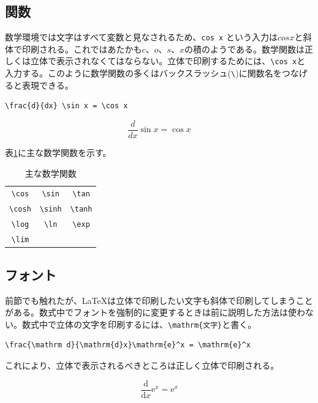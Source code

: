 \subsection{関数}
\label{sec:latex:func}

数学環境では文字はすべて変数と見なされるため、\verb|cos x| という入力は$cos x$と斜体で印刷される。これではあたかも$c$、$o$、$s$、$x$の積のようである。数学関数は正しくは立体で表示されなくてはならない。立体で印刷するためには、\verb|\cos x|と入力する。このように数学関数の多くはバックスラッシュ(\texttt{\textbackslash})に関数名をつなげると表現できる。
\begin{reidai}
\begin{verbatim}
\frac{d}{dx} \sin x = \cos x
\end{verbatim}
\end{reidai}
\vspace*{-1.5em}
\begin{kekka}
  \begin{equation*}
    \frac{d}{dx} \sin x = \cos x
  \end{equation*}
\end{kekka}
\noindent
表\ref{tab:func}に主な数学関数を示す。
\begin{table}[H]
  \begin{center}
    \caption{主な数学関数}
    \label{tab:func}
    \begin{tabular}{ccc}
      \verb|\cos| & \verb|\sin| & \verb|\tan| \\
      \verb|\cosh| & \verb|\sinh| & \verb|\tanh| \\
      \verb|\log| & \verb|\ln| & \verb|\exp| \\
      \verb|\lim| & & \\
    \end{tabular}
  \end{center}
\end{table}

\subsection{フォント}
\label{sec:latex:mathfont}

前節でも触れたが、\LaTeX は立体で印刷したい文字も斜体で印刷してしまうことがある。数式中でフォントを強制的に変更するときは前に説明した方法は使わない。数式中で立体の文字を印刷するには、\texttt{\textbackslash mathrm\{\textrm{文字}\}}と書く。
\begin{reidai}
\begin{verbatim}
\frac{\mathrm d}{\mathrm{d}x}\mathrm{e}^x = \mathrm{e}^x
\end{verbatim}
\end{reidai}
\noindent これにより、立体で表示されるべきところは正しく立体で印刷される。
\begin{kekka}
  \begin{equation*}
    \frac{\mathrm d}{\mathrm{d}x}\mathrm{e}^x = \mathrm{e}^x
  \end{equation*}
\end{kekka}

